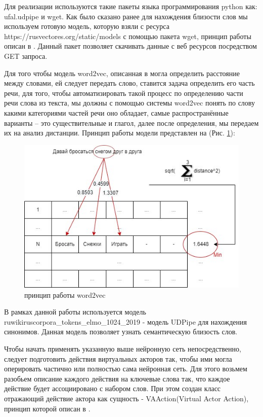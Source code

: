 Для реализации используются такие пакеты языка программирования python как: ufal.udpipe и wget. 
Как было сказано ранее для нахождения близости слов мы используем готовую модель, которую взяли с ресурса 
https://rusvectores.org/static/models с помощью пакета wget, принцип работы описан в \cite{neural08}. Данный пакет позволяет скачивать данные 
с веб ресурсов посредством GET запроса.

Для того чтобы модель word2vec, описанная в \cite{w2vec02} могла определить расстояние между словами, ей следует передать слово, ставится задача определить 
его часть речи, для того, чтобы автоматизировать такой процесс по определению части речи слова из текста, мы должны с помощью 
системы word2vec понять по слову какими категориями частей речи оно обладает, самые распространённые варианты – это 
существительные и глагол, далее после определения,  мы передаем их на анализ дистанции. 
Принцип работы модели представлен на (Рис. \ref{pic:ris15}):

\begin{figure}[H]
\includegraphics[width=0.75\columnwidth]{./img/ris15.png}
\centering
\caption{принцип работы word2vec}
\label{pic:ris15}
\end{figure}

В рамках данной работы используется модель ruwikiruscorpora\_tokens\_elmo\_1024\_2019 - модель UDPipe для нахождения синонимов. 
Данная модель позволяет узнать семантическую близость слов.

Чтобы начать применять указанную выше нейронную сеть непосредственно, следует подготовить действия виртуальных акторов так, 
чтобы ими могла оперировать частично или полностью сама нейронная сеть. Для этого возьмем разобьем описание каждого действия 
на ключевые слова так, что каждое действие будет ассоциировано с набором слов. При этом создан класс отражающий действие 
актора как сущность - VAAction(Virtual Actor Action), принцип которой описан в \cite{w2vec01}.

